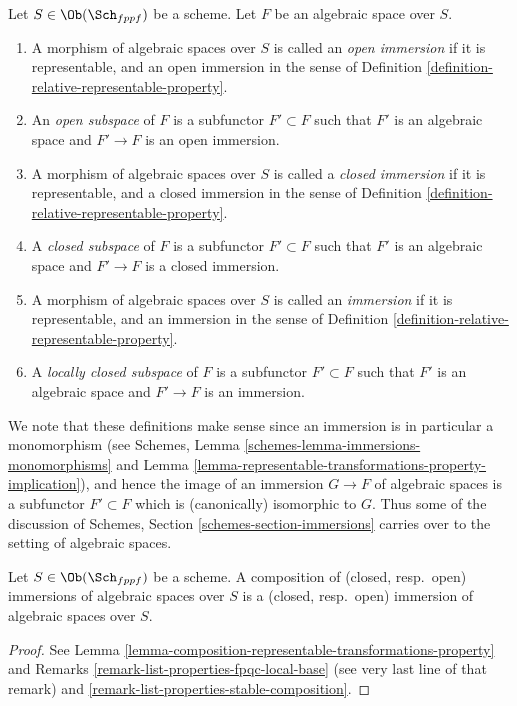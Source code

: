 \begin{definition}
\label{definition-immersion}
Let $S \in \Ob(\Sch_{fppf})$ be a scheme.
Let $F$ be an algebraic space over $S$.
\begin{enumerate}
\item A morphism of algebraic spaces over $S$
is called an {\it open immersion} if it is representable, and an open immersion
in the sense of Definition \ref{definition-relative-representable-property}.
\item An {\it open subspace} of $F$ is a subfunctor $F' \subset F$
such that $F'$ is an algebraic space and $F' \to F$ is an
open immersion.
\item A morphism of algebraic spaces over $S$
is called a {\it closed immersion} if it is representable, and a closed
immersion in the sense of
Definition \ref{definition-relative-representable-property}.
\item A {\it closed subspace} of $F$ is a subfunctor $F' \subset F$
such that $F'$ is an algebraic space and $F' \to F$ is a
closed immersion.
\item A morphism of algebraic spaces over $S$
is called an {\it immersion} if it is representable, and an immersion
in the sense of Definition \ref{definition-relative-representable-property}.
\item A {\it locally closed subspace} of $F$ is a subfunctor $F' \subset F$
such that $F'$ is an algebraic space and $F' \to F$ is an
immersion.
\end{enumerate}
\end{definition}

\noindent
We note that these definitions make sense since an immersion
is in particular a monomorphism (see
Schemes, Lemma \ref{schemes-lemma-immersions-monomorphisms}
and Lemma \ref{lemma-representable-transformations-property-implication}),
and hence the image of an
immersion $G \to F$ of algebraic spaces is a subfunctor $F' \subset F$
which is (canonically) isomorphic to $G$. Thus some of the discussion
of Schemes, Section \ref{schemes-section-immersions} carries over to the
setting of algebraic spaces.

\begin{lemma}
\label{lemma-composition-immersions}
Let $S \in \Ob(\Sch_{fppf})$ be a scheme.
A composition of (closed, resp.\ open) immersions of
algebraic spaces over $S$ is a (closed, resp.\ open)
immersion of algebraic spaces over $S$.
\end{lemma}

\begin{proof}
See Lemma \ref{lemma-composition-representable-transformations-property} and
Remarks \ref{remark-list-properties-fpqc-local-base} (see very last line of
that remark) and \ref{remark-list-properties-stable-composition}.
\end{proof}

